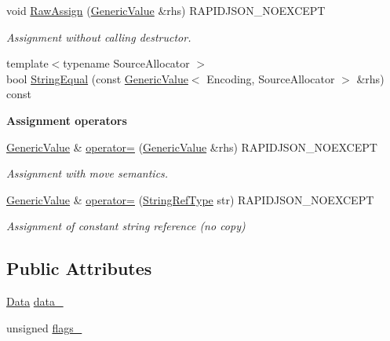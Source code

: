 \begin{DoxyCompactItemize}
void \hyperlink{classGenericValue_abb8ea2dfbe74ff4ee7dac6be31317f81}{Raw\+Assign} (\hyperlink{classGenericValue}{Generic\+Value} \&rhs) R\+A\+P\+I\+D\+J\+S\+O\+N\+\_\+\+N\+O\+E\+X\+C\+E\+PT
\begin{DoxyCompactList}\small\item\em Assignment without calling destructor. \end{DoxyCompactList}\item 
{\footnotesize template$<$typename Source\+Allocator $>$ }\\bool \hyperlink{classGenericValue_a5ff908402687e14f5f14552ec58113a4}{String\+Equal} (const \hyperlink{classGenericValue}{Generic\+Value}$<$ Encoding, Source\+Allocator $>$ \&rhs) const 
\end{DoxyCompactItemize}
\begin{Indent}{\bf Assignment operators}\par
\begin{DoxyCompactItemize}
\item 
\hyperlink{classGenericValue}{Generic\+Value} \& \hyperlink{classGenericValue_a9018a40d7c52efc00daf803c51d3236c}{operator=} (\hyperlink{classGenericValue}{Generic\+Value} \&rhs) R\+A\+P\+I\+D\+J\+S\+O\+N\+\_\+\+N\+O\+E\+X\+C\+E\+PT
\begin{DoxyCompactList}\small\item\em Assignment with move semantics. \end{DoxyCompactList}\item 
\hyperlink{classGenericValue}{Generic\+Value} \& \hyperlink{classGenericValue_a386708557555e6389184de608af5e6a6}{operator=} (\hyperlink{classGenericValue_a32e0f30ee278072374c8168b14d3317f}{String\+Ref\+Type} str) R\+A\+P\+I\+D\+J\+S\+O\+N\+\_\+\+N\+O\+E\+X\+C\+E\+PT
\begin{DoxyCompactList}\small\item\em Assignment of constant string reference (no copy) \end{DoxyCompactList}\end{DoxyCompactItemize}
\end{Indent}
\subsection*{Public Attributes}
\begin{DoxyCompactItemize}
\item 
\hyperlink{unionGenericValue_1_1Data}{Data} \hyperlink{classGenericValue_aaf80f2c91d26fdde60b9edeeecd3509f}{data\+\_\+}
\item 
unsigned \hyperlink{classGenericValue_ad0f9ce0bc0d1714678a77a2295da420c}{flags\+\_\+}
\end{DoxyCompactItemize}
